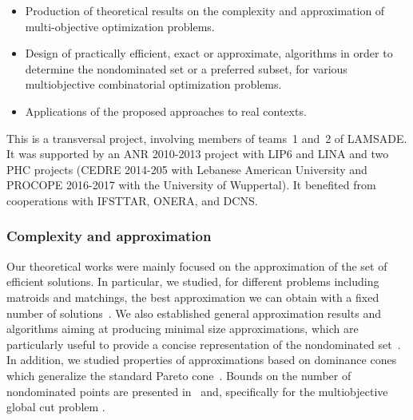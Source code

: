 \begin{itemize}
\item Production of theoretical results on the complexity and approximation of multi-objective optimization problems.
\item Design of practically efficient, exact or approximate, algorithms in order to determine the nondominated set or a preferred subset, for various multiobjective combinatorial optimization problems.
\item Applications of the proposed approaches to real contexts.
\end{itemize}

This is a transversal project, involving members of teams~1 and~2 of LAMSADE. It was supported by an ANR 2010-2013 project with LIP6 and LINA and two PHC projects (CEDRE 2014-205 with Lebanese American University and PROCOPE 2016-2017 with the University of Wuppertal). It benefited from cooperations with IFSTTAR, ONERA, and DCNS.


\subsubsection{Complexity and approximation}


Our theoretical works were mainly focused on the approximation of the set of efficient solutions. In particular, we studied, for different problems including matroids and matchings, the best approximation we can obtain with a fixed number of solutions~\cite{Bazgan2013Single-624467,Bazgan2013Approximation-624791,Gourves2015Approximate-634726, DBLP:journals/tcs/GourvesMPV17}. We also established general approximation results and algorithms aiming at producing minimal size approximations, which are particularly useful to provide a concise representation of the nondominated set~\cite{Bazgan2015Approximate-633407,Bazgan2016Discrete-1168159}. In addition, we studied properties of approximations based on dominance cones which generalize the standard Pareto cone~\cite{Vanderpooten2017Covers-1168175}. Bounds on the number of nondominated points are presented in~\cite{Bazgan2013On-626114} and, specifically for the multiobjective global cut problem \cite{Aissi2014A-775489,DBLP:journals/mp/AissiMMQ15}. 

